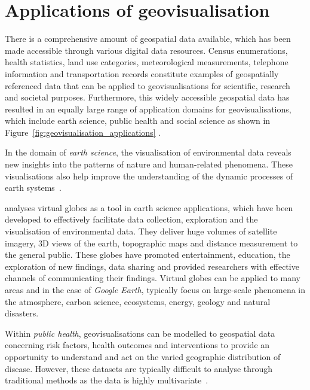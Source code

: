 \section{Applications of geovisualisation} {


	There is a comprehensive amount of geospatial data available, which has been made accessible through various digital data resources. Census enumerations, health statistics, land use categories, meteorological measurements, telephone information and transportation records constitute examples of geospatially referenced data that can be applied to geovisualisations for scientific, research and societal purposes. Furthermore, this widely accessible geospatial data has resulted in an equally large range of application domains for geovisualisations, which include earth science, public health and social science as shown in Figure~\ref{fig:geovisualisation_applications} \parencite{maceachren2004geovisualization}.

	

	In the domain of \emph{earth science}, the visualisation of environmental data reveals new insights into the patterns of nature and human-related phenomena. These visualisations also help improve the understanding of the dynamic processes of earth systems~\parencite{yu2012google}.

	\textcite{yu2012google} analyses virtual globes as a tool in earth science applications, which have been developed to effectively facilitate data collection, exploration and the visualisation of environmental data. They deliver huge volumes of satellite imagery, 3D views of the earth, topographic maps and distance measurement to the general public. These globes have promoted entertainment, education, the exploration of new findings, data sharing and provided researchers with effective channels of communicating their findings. Virtual globes can be applied to many areas and in the case of \emph{Google Earth}, typically focus on large-scale phenomena in the atmosphere, carbon science, ecosystems, energy, geology and natural disasters.

	Within \emph{public health}, geovisualisations can be modelled to geospatial data concerning risk factors, health outcomes and interventions to provide an opportunity to understand and act on the varied geographic distribution of disease. However, these datasets are typically difficult to analyse through traditional methods as the data is highly multivariate~\parencite{maceachren2004geovisualization}.

}
